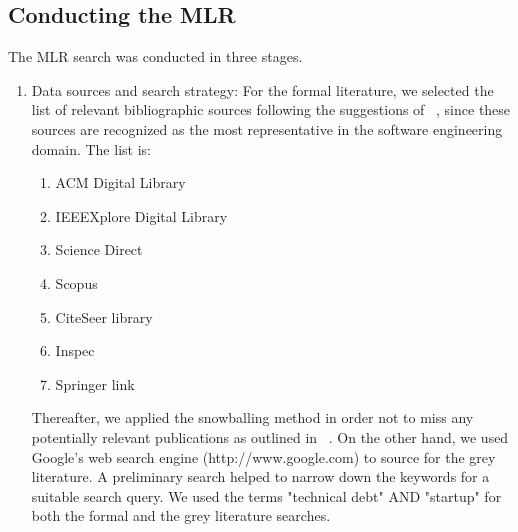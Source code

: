 \subsection{Conducting the MLR}
The MLR search was conducted in three stages.
\begin{enumerate}
\item Data sources and search strategy: For the formal literature, we selected the list of relevant bibliographic sources following the suggestions of ~\cite{kitchenham2007guidelines}, since these sources are
recognized as the most representative in the software engineering domain. The list is: 
\begin{enumerate}
   \item ACM Digital Library
\item IEEEXplore Digital Library
\item Science Direct
\item Scopus
\item CiteSeer library
\item Inspec
\item Springer link
\end{enumerate} 

Thereafter, we applied the snowballing method in order not to miss any potentially relevant publications as outlined in ~\cite{Wohlin2014/2601248.2601268}.
On the other hand, we used Google's web search engine (http://www.google.com) to source for the grey literature.
A preliminary search helped to narrow down the keywords for a suitable search query. We used the terms "technical debt" AND "startup" for both the formal and the grey literature searches.


\end{enumerate}
